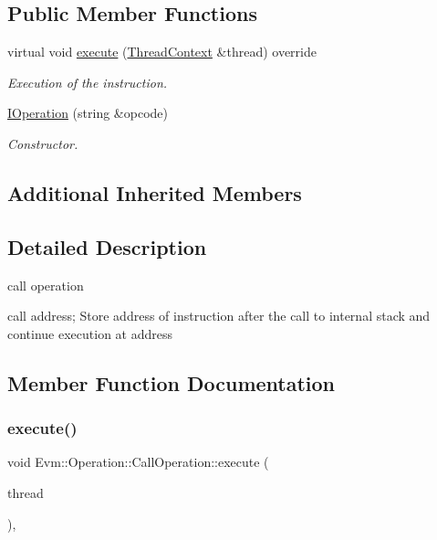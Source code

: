 \subsection*{Public Member Functions}
\begin{DoxyCompactItemize}
\item 
virtual void \mbox{\hyperlink{struct_evm_1_1_operation_1_1_call_operation_ace9fbeb98abf5de426629be6eec22fd2}{execute}} (\mbox{\hyperlink{struct_evm_1_1_thread_context}{Thread\+Context}} \&thread) override
\begin{DoxyCompactList}\small\item\em Execution of the instruction. \end{DoxyCompactList}\item 
\mbox{\hyperlink{struct_evm_1_1_operation_1_1_call_operation_a65e98ee1b1679e12c1d1dd000ebfe937}{I\+Operation}} (string \&opcode)
\begin{DoxyCompactList}\small\item\em Constructor. \end{DoxyCompactList}\end{DoxyCompactItemize}
\subsection*{Additional Inherited Members}


\subsection{Detailed Description}
call operation 

call address; Store address of instruction after the call to internal stack and continue execution at address 

\subsection{Member Function Documentation}
\mbox{\label{struct_evm_1_1_operation_1_1_call_operation_ace9fbeb98abf5de426629be6eec22fd2}} 
\subsubsection{\texorpdfstring{execute()}{execute()}}
{\footnotesize\ttfamily void Evm\+::\+Operation\+::\+Call\+Operation\+::execute (\begin{DoxyParamCaption}\item[{\mbox{\hyperlink{struct_evm_1_1_thread_context}{Thread\+Context}} \&}]{thread }\end{DoxyParamCaption})\hspace{0.3cm}{\ttfamily [override]}, {\ttfamily [virtual]}}



